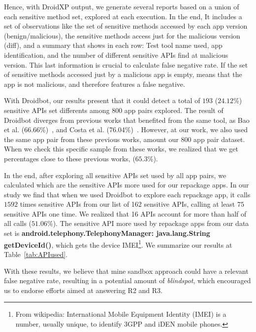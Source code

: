 Hence, with DroidXP output, we generate several reports based on a union of each sensitive method set, explored at each execution. In the end, It includes a set of observations like the set of sensitive methods accessed by each app version (benign/malicious), the sensitive methods access just for the malicious version (diff), and a summary that shows in each row: Test tool name used, app identification, and the number of different sensitive APIs find at malicious version. This last information is crucial to calculate false negative rate. If the set of sensitive methods accessed just by a malicious app is empty, means that the app is not malicious, and therefore features a false negative.

With Droidbot, our results present that it could detect a total of $193$ ($24.12$\%) sensitive APIs set differents among $800$ app pairs explored. The result of Droidbot diverges from previous works that benefited from the same tool, as Bao et al. (66.66\%)~\cite{DBLP:conf/wcre/BaoLL18}, and Costa et al. (76.04\%)~\cite{DBLP:journals/jss/CostaMMSSBNR22}. However, at our work, we also used the same app pair from these previous works, amount our $800$ app pair dataset. When we check this specific sample from these works, we realized that we get percentages close to these previous works, ($65.3$\%). 

In the end, after exploring all sensitive APIs set used by all app pairs, we calculated which are the sensitive APIs more used for our repackage apps. In our study we find that when we used Droidbot to explore each repackage app, it calls $1592$ times sensitive APIs from our list of 162 sensitive APIs, calling at least $75$ sensitive APIs one time. We realized that 16 APIs account for more than half of all calls ($51.06$\%). The sensitive API more used by repackage apps from our data set is \textbf{android.telephony.TelephonyManager: java.lang.String getDeviceId()}, which gets the device IMEI\footnote{From wikipedia: International Mobile Equipment Identity (IMEI) is a number, usually unique, to identify 3GPP and iDEN mobile phones.}. We summarize our results at Table~\ref{tab:APIused}. 

With these results, we believe that mine sandbox approach could have a relevant false negative rate, resulting in a potential amount of \textit{blindspot}, which encouraged us to endorse efforts aimed at answering R2 and R3.

